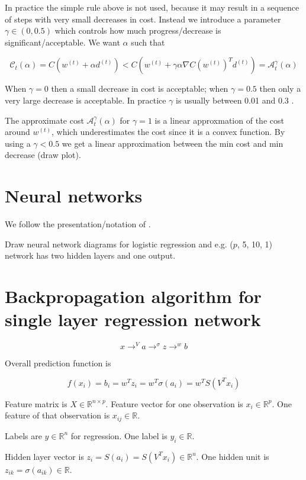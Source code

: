 \documentclass{article}
\begin{document}
In practice the simple rule above is not used, because it may result
in a sequence of steps with very small decreases in cost. Instead we
introduce a parameter $\gamma\in(0,0.5)$ which controls how much
progress/decrease is significant/acceptable. 
We want $\alpha$ such that

\begin{equation}
  \mathcal C_t(\alpha) = C(w^{(t)} + \alpha d^{(t)}) < 
C(w^{(t)} + \gamma \alpha \nabla C(w^{(t)})^T d^{(t)})= \mathcal A_{t}^\gamma(\alpha)
\end{equation}

When $\gamma=0$ then a small decrease in cost is acceptable; when
$\gamma=0.5$ then only a very large decrease is acceptable. In
practice $\gamma$ is usually between 0.01 and 0.3 \citep[page 466]{Boyd2004}.

The approximate cost $\mathcal A_{t}^\gamma(\alpha)$ for $\gamma=1$ is
a linear approxmation of the cost around $w^{(t)}$, which
underestimates the cost since it is a convex function. By using a
$\gamma<0.5$ we get a linear approximation between the min cost and
min decrease (draw plot).

\section{Neural networks}

We follow the presentation/notation of \citet[section~16.5]{Murphy2012}.

Draw neural network diagrams for logistic regression and e.g. ($p$, 5, 10, 1) network has two hidden layers and one output.

\section{Backpropagation algorithm for single layer regression network}

$$
x \rightarrow^V a \rightarrow^\sigma z \rightarrow^w b
$$

Overall prediction function is 

$$
f(x_i) = b_i = w^T z_i = w^T \sigma(a_i) = w^T S(V^T x_i)
$$

Feature matrix is $X\in\mathbb R^{n\times p}$. Feature vector for one observation is $x_i\in\mathbb R^p$. One feature of that observation is $x_{ij}\in\mathbb R$.

Labels are $y\in\mathbb R^n$ for regression. One label is $y_i\in\mathbb R$.

Hidden layer vector is $z_i = S(a_i) = S(V^T x_i) \in\mathbb R^u$. One hidden unit is $z_{ik}=\sigma(a_{ik})\in\mathbb R$.
\end{document}
